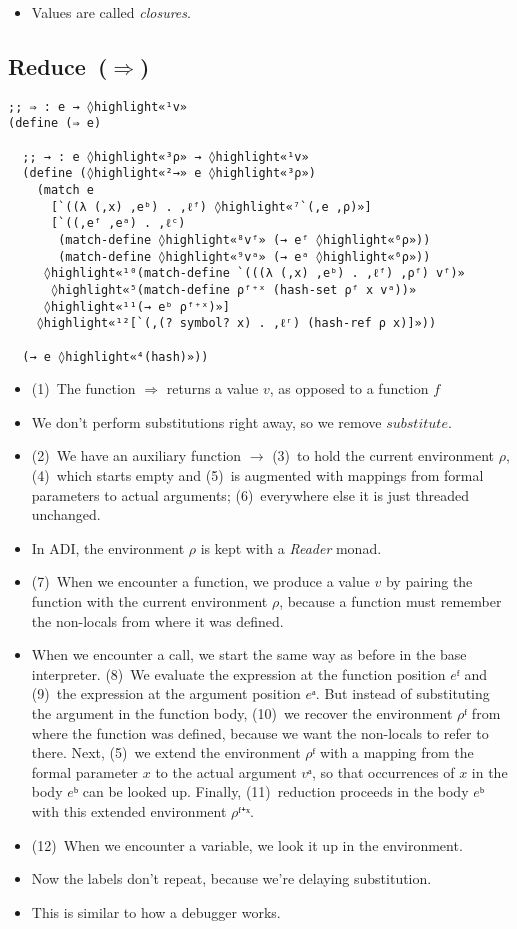 \documentclass[12pt, oneside]{book}
\begin{document}
\begin{itemize}
  \item Values are called \emph{closures}.
\end{itemize}

\subsection{Reduce~(\(⇒\))}

\begin{Verbatim}
;; ⇒ : e → ◊highlight«¹v»
(define (⇒ e)

  ;; → : e ◊highlight«³ρ» → ◊highlight«¹v»
  (define (◊highlight«²→» e ◊highlight«³ρ»)
    (match e
      [`((λ (,x) ,eᵇ) . ,ℓᶠ) ◊highlight«⁷`(,e ,ρ)»]
      [`((,eᶠ ,eᵃ) . ,ℓᶜ)
       (match-define ◊highlight«⁸vᶠ» (→ eᶠ ◊highlight«⁶ρ»))
       (match-define ◊highlight«⁹vᵃ» (→ eᵃ ◊highlight«⁶ρ»))
     ◊highlight«¹⁰(match-define `(((λ (,x) ,eᵇ) . ,ℓᶠ) ,ρᶠ) vᶠ)»
      ◊highlight«⁵(match-define ρᶠ⁺ˣ (hash-set ρᶠ x vᵃ))»
     ◊highlight«¹¹(→ eᵇ ρᶠ⁺ˣ)»]
    ◊highlight«¹²[`(,(? symbol? x) . ,ℓʳ) (hash-ref ρ x)]»))

  (→ e ◊highlight«⁴(hash)»))
\end{Verbatim}

\begin{itemize}
  \item (1)~The function \(⇒\) returns a value \(v\), as opposed to a function \(f\)
  \item We don’t perform substitutions right away, so we remove \(substitute\).
  \item (2)~We have an auxiliary function \(→\) (3)~to hold the current environment \(ρ\), (4)~which starts empty and (5)~is augmented with mappings from formal parameters to actual arguments; (6)~everywhere else it is just threaded unchanged.
  \item In ADI, the environment \(ρ\) is kept with a \emph{Reader} monad.
  \item (7)~When we encounter a function, we produce a value \(v\) by pairing the function with the current environment \(ρ\), because a function must remember the non-locals from where it was defined.
  \item When we encounter a call, we start the same way as before in the base interpreter. (8)~We evaluate the expression at the function position \(eᶠ\) and (9)~the expression at the argument position \(eᵃ\). But instead of substituting the argument in the function body, (10)~we recover the environment \(ρᶠ\) from where the function was defined, because we want the non-locals to refer to there. Next, (5)~we extend the environment \(ρᶠ\) with a mapping from the formal parameter \(x\) to the actual argument \(vᵃ\), so that occurrences of \(x\) in the body \(eᵇ\) can be looked up. Finally, (11)~reduction proceeds in the body \(eᵇ\) with this extended environment \(ρᶠ⁺ˣ\).
  \item (12)~When we encounter a variable, we look it up in the environment.
  \item Now the labels don’t repeat, because we’re delaying substitution.
  \item This is similar to how a debugger works.
\end{itemize}
\end{document}
